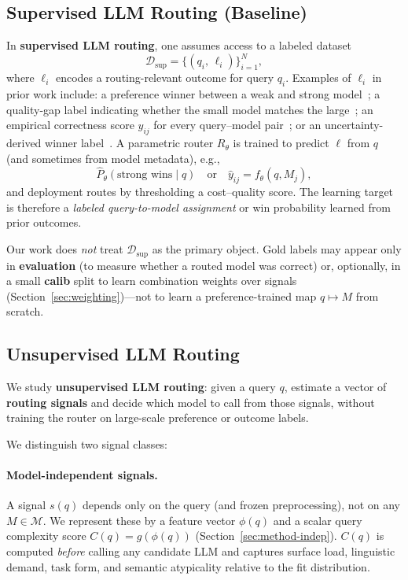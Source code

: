 \subsection{Supervised LLM Routing (Baseline)}
\label{sec:supervised-baseline}

In \textbf{supervised LLM routing}, one assumes access to a labeled dataset
\begin{equation}
\mathcal{D}_{\mathrm{sup}}=\bigl\{(q_i,\,\ell_i)\bigr\}_{i=1}^{N},
\end{equation}
where $\ell_i$ encodes a routing-relevant outcome for query $q_i$.
Examples of $\ell_i$ in prior work include: a preference winner between a weak and strong model~\cite{ong2025routellm}; a quality-gap label indicating whether the small model matches the large~\cite{ding2024hybrid}; an empirical correctness score $y_{ij}$ for every query--model pair~\cite{song2025irt}; or an uncertainty-derived winner label~\cite{zhang2025uncertainty}.
A parametric router $R_\theta$ is trained to predict $\ell$ from $q$ (and sometimes from model metadata), e.g.,
\begin{equation}
\hat{P}_\theta(\text{strong wins}\mid q)\quad\text{or}\quad \hat{y}_{ij}=f_\theta(q,M_j),
\end{equation}
and deployment routes by thresholding a cost--quality score.
The learning target is therefore a \emph{labeled query-to-model assignment} or win probability learned from prior outcomes.

Our work does \emph{not} treat $\mathcal{D}_{\mathrm{sup}}$ as the primary object.
Gold labels may appear only in \textbf{evaluation} (to measure whether a routed model was correct) or, optionally, in a small \textbf{calib} split to learn combination weights over signals (Section~\ref{sec:weighting})---not to learn a preference-trained map $q\mapsto M$ from scratch.

\subsection{Unsupervised LLM Routing}
\label{sec:unsupervised-def}

We study \textbf{unsupervised LLM routing}: given a query $q$, estimate a vector of \textbf{routing signals} and decide which model to call from those signals, without training the router on large-scale preference or outcome labels.

We distinguish two signal classes:

\paragraph{Model-independent signals.}
A signal $s(q)$ depends only on the query (and frozen preprocessing), not on any $M\in\mathcal{M}$.
We represent these by a feature vector $\phi(q)$ and a scalar query complexity score $C(q)=g(\phi(q))$ (Section~\ref{sec:method-indep}).
$C(q)$ is computed \emph{before} calling any candidate LLM and captures surface load, linguistic demand, task form, and semantic atypicality relative to the fit distribution.

